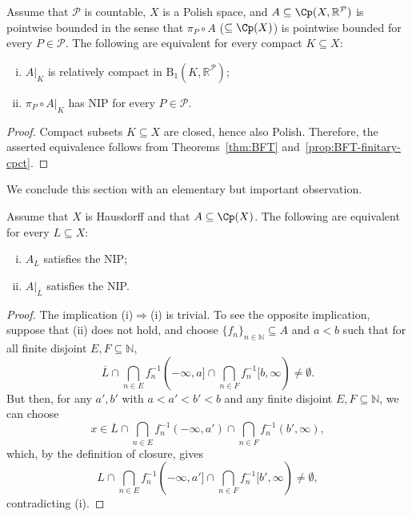 \begin{theorem}\label{thm:Generalized-BFT}
    Assume that $\mathcal{P}$ is countable, $X$ is a Polish space, and $A\subseteq \Cp(X,\mathbb{R}^\mathcal{P})$ is pointwise bounded in the sense that $\pi_P\circ A$ ($\subseteq \Cp(X)$) is pointwise bounded for every $P\in\mathcal{P}$.
    The following are equivalent for every compact $K\subseteq X$:

    \begin{enumerate}[(i)]
        \item $A|_K$ is relatively compact in $\mathrm{B}_1(K,\mathbb{R}^\mathcal{P})$;
        \item $\pi_P\circ A|_K$ has NIP for every $P\in\mathcal{P}$.
    \end{enumerate}
\end{theorem}

\begin{proof}
    Compact subsets $K\subseteq X$ are closed, hence also Polish.
    Therefore, the asserted equivalence follows from Theorems~\ref{thm:BFT} and~\ref{prop:BFT-finitary-cpct}.
\end{proof}

We conclude this section with an elementary but important observation.

\begin{lemma}\label{lem:NIP-and-closure}
    Assume that $X$ is Hausdorff and that $A\subseteq \Cp(X)$.
    The following are equivalent for every $L\subseteq X$:
    \begin{enumerate}[(i)]
        \item
        $A_L$ satisfies the NIP;
        \item
        $A|_{\overline{L}}$ satisfies the NIP.
    \end{enumerate}
\end{lemma}

\begin{proof}
    The implication (i)$\Rightarrow$(i) is trivial.  To see the opposite implication, suppose that (ii) does not hold, and choose $\{f_n\}_{n\in\mathbb{N}}\subseteq A$ and $a<b$ such that for all finite disjoint $E,F\subseteq\mathbb{N}$,
    \[
	\overline{L}\cap\bigcap_{n\in E}f_n^{-1}(-\infty,a]\cap\bigcap_{n\in F}f_n^{-1}[b,\infty)\neq\emptyset.
    \]
    But then, for any $a',b'$ with $a<a'<b'<b$ and any finite disjoint $E,F\subseteq\mathbb{N}$, we can choose
    \[
	x\in\overline{L}\cap\bigcap_{n\in E}f_n^{-1}(-\infty,a')\cap\bigcap_{n\in F}f_n^{-1}(b',\infty),
    \]
    which, by the definition of closure, gives
    \[
	L\cap\bigcap_{n\in E}f_n^{-1}(-\infty,a']\cap\bigcap_{n\in F}f_n^{-1}[b',\infty)\neq\emptyset,
    \]
    contradicting (i).
\end{proof}

